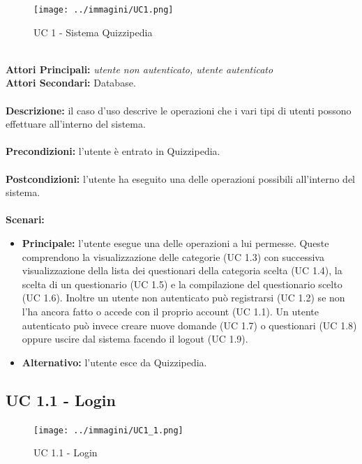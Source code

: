 \documentclass[a4paper,11pt]{article}
\begin{document}
\begin{figure}[h!]
\centering
\texttt{[image: ../immagini/UC1.png]}
\caption{UC 1 - Sistema Quizzipedia}
\end{figure}
\ \\
\textbf{Attori Principali:} \textit{utente non autenticato, utente autenticato}
\\
\textbf{Attori Secondari:} Database.\\
\\
\textbf{Descrizione:} il caso d'uso descrive le operazioni che i vari tipi di utenti possono effettuare all'interno del sistema.\\
\\
\textbf{Precondizioni:} l'utente è entrato in Quizzipedia.\\
\\
\textbf{Postcondizioni:} l'utente ha eseguito una delle operazioni possibili all'interno del sistema.\\
\\
\textbf{Scenari:}
\begin{itemize}
\item \textbf{Principale: } l'utente esegue una delle operazioni a lui permesse. Queste comprendono la visualizzazione delle categorie (UC 1.3) con successiva visualizzazione della lista dei questionari della categoria scelta (UC 1.4), la scelta di un questionario (UC 1.5) e la compilazione del questionario scelto (UC 1.6). Inoltre un utente non autenticato può registrarsi (UC 1.2) se non l'ha ancora fatto o accede con il proprio account (UC 1.1). Un utente autenticato può invece creare nuove domande (UC 1.7) o questionari (UC 1.8) oppure uscire dal sistema facendo il logout (UC 1.9).
\item \textbf{Alternativo: } l'utente esce da Quizzipedia.
\end{itemize}
\newpage
\subsection{UC 1.1 - Login}
\begin{figure}[h!]
\centering
\texttt{[image: ../immagini/UC1\_1.png]}
\caption{UC 1.1 - Login}
\end{figure}
\end{document}
